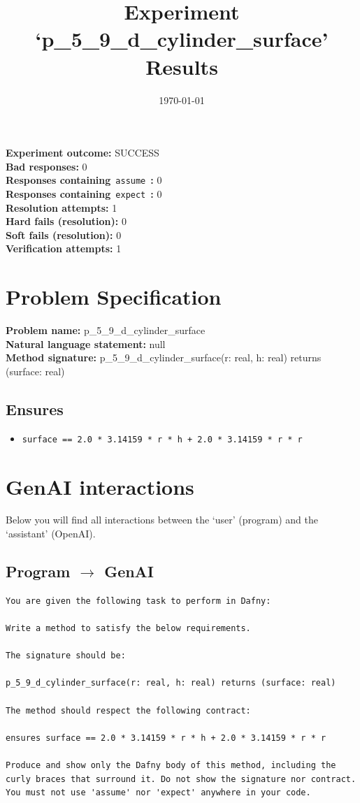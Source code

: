 \documentclass{article}
\begin{document}
\title{Experiment `p\_5\_9\_d\_cylinder\_surface' Results}
\author{\today}
\date{}
\maketitle
\textbf{Experiment outcome: }SUCCESS
\\\textbf{Bad responses: }0
\\\textbf{Responses containing}~\texttt{assume}~\textbf{: }0
\\\textbf{Responses containing}~\texttt{expect}~\textbf{: }0
\\\textbf{Resolution attempts: }1
\\\textbf{Hard fails (resolution): }0
\\\textbf{Soft fails (resolution): }0
\\\textbf{Verification attempts: }1
\section*{Problem Specification}
\textbf{Problem name: }p\_5\_9\_d\_cylinder\_surface
\\\textbf{Natural language statement: }null
\\\textbf{Method signature: }p\_5\_9\_d\_cylinder\_surface(r: real, h: real) returns (surface: real)
\subsection*{Ensures}
\begin{itemize}
\item \texttt{surface == 2.0 * 3.14159 * r * h + 2.0 * 3.14159 * r * r}
\end{itemize}
\clearpage
\section*{GenAI interactions}
Below you will find all interactions between the `user' (program) and the `assistant' (OpenAI).
\subsection*{Program $\rightarrow$ GenAI}
\begin{lstlisting}
You are given the following task to perform in Dafny:

Write a method to satisfy the below requirements.

The signature should be:

p_5_9_d_cylinder_surface(r: real, h: real) returns (surface: real)

The method should respect the following contract:

ensures surface == 2.0 * 3.14159 * r * h + 2.0 * 3.14159 * r * r

Produce and show only the Dafny body of this method, including the curly braces that surround it. Do not show the signature nor contract. You must not use 'assume' nor 'expect' anywhere in your code.
\end{lstlisting}
\end{document}
